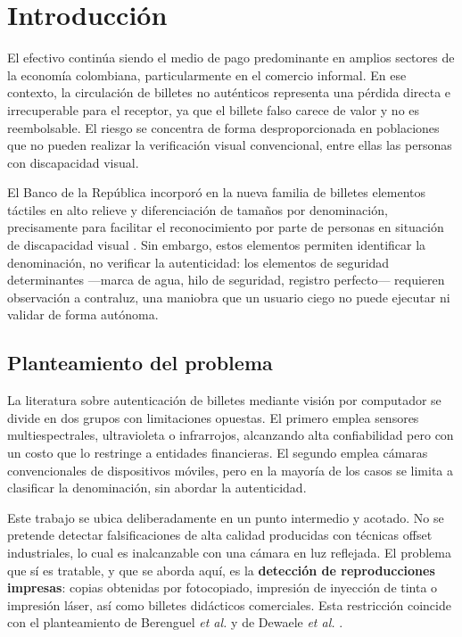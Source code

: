 \documentclass[conference]{IEEEtran}
\begin{document}
\section{Introducción}

El efectivo continúa siendo el medio de pago predominante en amplios
sectores de la economía colombiana, particularmente en el comercio
informal. En ese contexto, la circulación de billetes no auténticos
representa una pérdida directa e irrecuperable para el receptor, ya que
el billete falso carece de valor y no es reembolsable. El riesgo se
concentra de forma desproporcionada en poblaciones que no pueden
realizar la verificación visual convencional, entre ellas las personas
con discapacidad visual.

El Banco de la República incorporó en la nueva familia de billetes
elementos táctiles en alto relieve y diferenciación de tamaños por
denominación, precisamente para facilitar el reconocimiento por parte de
personas en situación de discapacidad visual \cite{banrep}. Sin embargo,
estos elementos permiten identificar la denominación, no verificar la
autenticidad: los elementos de seguridad determinantes ---marca de agua,
hilo de seguridad, registro perfecto--- requieren observación a
contraluz, una maniobra que un usuario ciego no puede ejecutar ni
validar de forma autónoma.

\subsection{Planteamiento del problema}

La literatura sobre autenticación de billetes mediante visión por
computador se divide en dos grupos con limitaciones opuestas. El primero
emplea sensores multiespectrales, ultravioleta o infrarrojos, alcanzando
alta confiabilidad pero con un costo que lo restringe a entidades
financieras. El segundo emplea cámaras convencionales de dispositivos
móviles, pero en la mayoría de los casos se limita a clasificar la
denominación, sin abordar la autenticidad.

Este trabajo se ubica deliberadamente en un punto intermedio y acotado.
No se pretende detectar falsificaciones de alta calidad producidas con
técnicas offset industriales, lo cual es inalcanzable con una cámara en
luz reflejada. El problema que sí es tratable, y que se aborda aquí, es
la \textbf{detección de reproducciones impresas}: copias obtenidas por
fotocopiado, impresión de inyección de tinta o impresión láser, así como
billetes didácticos comerciales. Esta restricción coincide con el
planteamiento de Berenguel \textit{et al.} \cite{berenguel2016} y de
Dewaele \textit{et al.} \cite{dewaele2016}.
\end{document}
